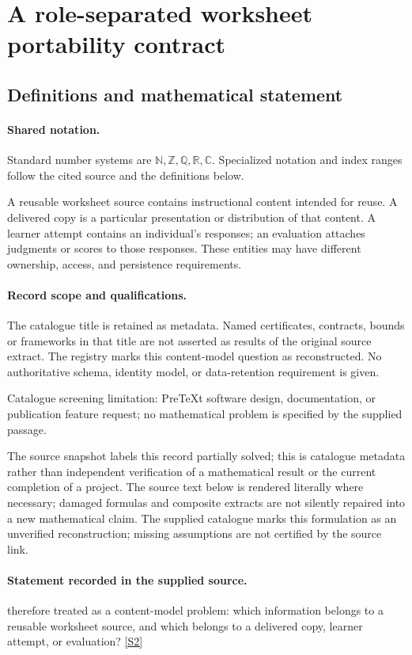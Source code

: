 \documentclass[11pt]{article}
\newcommand{\sref}[2]{\hyperlink{source:#1:#2}{[S#2]}}
\begin{document}
\section{A role-separated worksheet portability contract}\label{statement}

\subsection{Definitions and mathematical statement}

\paragraph{Shared notation.}Standard number systems are $\mathbb N,\mathbb Z,\mathbb Q,\mathbb R,\mathbb C$. Specialized notation and index ranges follow the cited source and the definitions below.


A reusable worksheet source contains instructional content intended for reuse. A delivered copy is a particular presentation or distribution of that content. A learner attempt contains an individual's responses; an evaluation attaches judgments or scores to those responses. These entities may have different ownership, access, and persistence requirements.
\paragraph{Record scope and qualifications.}
The catalogue title is retained as metadata. Named certificates, contracts, bounds or frameworks in that title are not asserted as results of the original source extract.
The registry marks this content-model question as reconstructed. No authoritative schema, identity model, or data-retention requirement is given.

Catalogue screening limitation: PreTeXt software design, documentation, or publication feature request; no mathematical problem is specified by the supplied passage.

The source snapshot labels this record partially solved; this is catalogue metadata rather than independent verification of a mathematical result or the current completion of a project.
The source text below is rendered literally where necessary; damaged formulas and composite extracts are not silently repaired into a new mathematical claim.
The supplied catalogue marks this formulation as an unverified reconstruction; missing assumptions are not certified by the source link.
\paragraph{Statement recorded in the supplied source.}
therefore treated as a content-model problem: which information belongs to a
reusable worksheet source, and which belongs to a delivered copy, learner
attempt, or evaluation? \sref{statement}{2}
\end{document}
